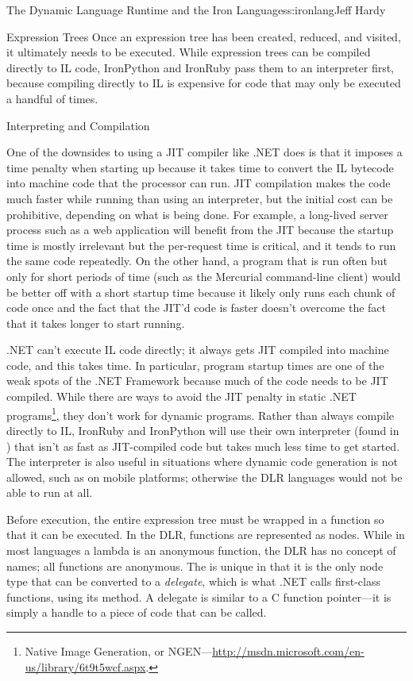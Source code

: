 \begin{aosachapter}{The Dynamic Language Runtime and the Iron Languages}{s:ironlang}{Jeff Hardy}
\begin{aosasect1}{Expression Trees}
Once an expression tree has been created, reduced, and visited, it ultimately
needs to be executed. While expression trees can be compiled directly to IL
code, IronPython and IronRuby pass them to an interpreter first, because
compiling directly to IL is expensive for code that may only be executed a
handful of times.

\end{aosasect1}

\begin{aosasect1}{Interpreting and Compilation}

One of the downsides to using a JIT compiler like .NET does is that it imposes
a time penalty when starting up because it takes time to convert the IL
bytecode into machine code that the processor can run. JIT compilation makes
the code much faster while running than using an interpreter, but the initial
cost can be prohibitive, depending on what is being done. For example, a
long-lived server process such as a web application will benefit from the JIT
because the startup time is mostly irrelevant but the per-request time is
critical, and it tends to run the same code repeatedly. On the other hand, a
program that is run often but only for short periods of time (such as the
Mercurial command-line client) would be better off with a short startup time
because it likely only runs each chunk of code once and the fact that the JIT'd
code is faster doesn't overcome the fact that it takes longer to start running.

.NET can't execute IL code directly; it always gets JIT compiled into machine
code, and this takes time. In particular, program startup times are one of the
weak spots of the .NET Framework because much of the code needs to be JIT
compiled. While there are ways to avoid the JIT penalty in static .NET
programs\footnote{Native Image Generation, or
NGEN---\url{http://msdn.microsoft.com/en-us/library/6t9t5wcf.aspx}.}, they
don't work for dynamic programs. Rather than always compile directly to IL,
IronRuby and IronPython will use their own interpreter (found in
) that isn't as fast as JIT-compiled code
but takes much less time to get started. The interpreter is also useful in
situations where dynamic code generation is not allowed, such as on mobile
platforms; otherwise the DLR languages would not be able to run at all.

Before execution, the entire expression tree must be wrapped in a function so
that it can be executed. In the DLR, functions are represented as
 nodes. While in most languages a lambda is an anonymous
function, the DLR has no concept of names; all functions are anonymous. The
 is unique in that it is the only node type that can be
converted to a \emph{delegate}, which is what .NET calls first-class functions,
using its  method. A delegate is similar to a C function
pointer---it is simply a handle to a piece of code that can be called.


\end{aosasect1}
\end{aosachapter}
